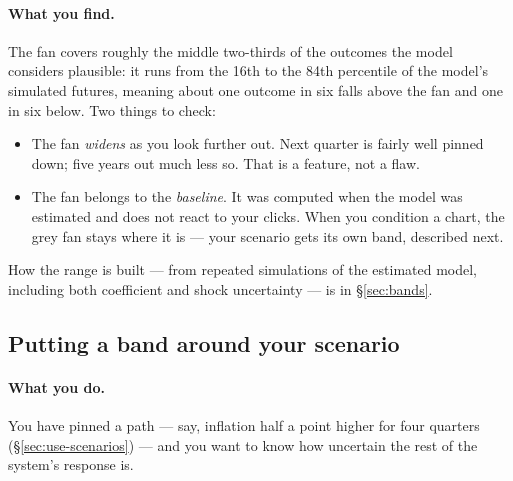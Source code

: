 \documentclass[11pt]{article}
\theoremstyle{definition}
\theoremstyle{remark}
\begin{document}
\paragraph{What you find.} The fan covers roughly the middle two-thirds of the outcomes
the model considers plausible: it runs from the 16th to the 84th percentile of the
model's simulated futures, meaning about one outcome in six falls above the fan and one
in six below. Two things to check:
\begin{itemize}
  \item The fan \emph{widens} as you look further out. Next quarter is fairly
    well pinned down; five years out much less so. That is a feature, not a flaw.
  \item The fan belongs to the \emph{baseline}. It was computed when the model was
    estimated and does not react to your clicks. When you condition a chart, the grey
    fan stays where it is --- your scenario gets its own band, described next.
\end{itemize}
How the range is built --- from repeated simulations of the estimated model, including
both coefficient and shock uncertainty --- is in \S\ref{sec:bands}.

\subsection{Putting a band around your scenario}

\paragraph{What you do.} You have pinned a path --- say, inflation half a point higher
for four quarters (\S\ref{sec:use-scenarios}) --- and you want to know how uncertain
the rest of the system's response is.
\end{document}
